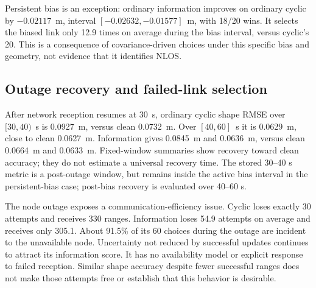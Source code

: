 Persistent bias is an exception: ordinary information improves on ordinary cyclic by \(-0.02117\)~m, interval \([-0.02632,-0.01577]\)~m, with 18/20 wins. It selects the biased link only 12.9 times on average during the bias interval, versus cyclic's 20. This is a consequence of covariance-driven choices under this specific bias and geometry, not evidence that it identifies NLOS.

\subsection{Outage recovery and failed-link selection}
After network reception resumes at \SI{30}{s}, ordinary cyclic shape RMSE over \([30,40)\)~s is \SI{0.0927}{m}, versus clean \SI{0.0732}{m}. Over \([40,60]\)~s it is \SI{0.0629}{m}, close to clean \SI{0.0627}{m}. Information gives \SI{0.0845}{m} and \SI{0.0636}{m}, versus clean \SI{0.0664}{m} and \SI{0.0633}{m}. Fixed-window summaries show recovery toward clean accuracy; they do not estimate a universal recovery time. The stored 30--40 s metric is a post-outage window, but remains inside the active bias interval in the persistent-bias case; post-bias recovery is evaluated over 40--60 s.

The node outage exposes a communication-efficiency issue. Cyclic loses exactly 30 attempts and receives 330 ranges. Information loses 54.9 attempts on average and receives only 305.1. About 91.5\% of its 60 choices during the outage are incident to the unavailable node. Uncertainty not reduced by successful updates continues to attract its information score. It has no availability model or explicit response to failed reception. Similar shape accuracy despite fewer successful ranges does not make those attempts free or establish that this behavior is desirable.

